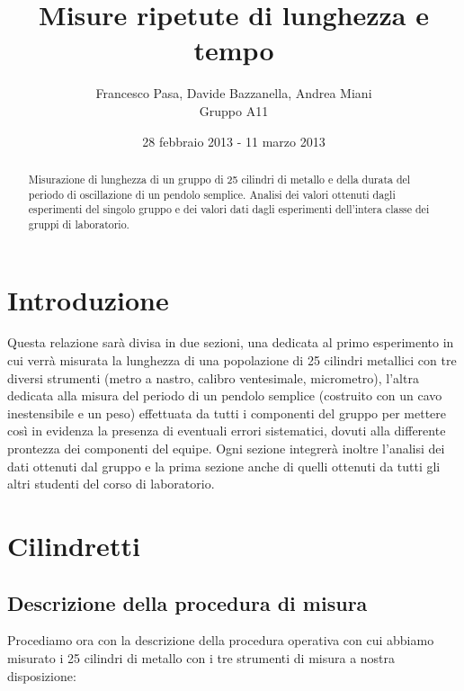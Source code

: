 \documentclass[12pt, twoside, a4paper]{article}
\begin{document}
\title{Misure ripetute di lunghezza e tempo}
\author{Francesco Pasa, Davide Bazzanella, Andrea Miani\\
Gruppo A11}
\date{28 febbraio 2013 - 11 marzo 2013}
\maketitle

\begin{abstract}
Misurazione di lunghezza di un gruppo di 25 cilindri di metallo e della durata del periodo di oscillazione di un pendolo semplice.
Analisi dei valori ottenuti dagli esperimenti del singolo gruppo e dei valori dati dagli esperimenti dell'intera classe dei gruppi di laboratorio.
\end{abstract}

\section{Introduzione}
Questa relazione sarà divisa in due sezioni, una dedicata al primo esperimento in cui verrà misurata la lunghezza di una popolazione di 25 cilindri metallici con tre diversi strumenti (metro a nastro, calibro ventesimale, micrometro), l'altra dedicata alla misura del periodo di un pendolo semplice (costruito con un cavo inestensibile e un peso) effettuata da tutti i componenti del gruppo per mettere così in evidenza la presenza di eventuali errori sistematici, dovuti alla differente prontezza dei componenti del equipe. Ogni sezione integrerà inoltre l'analisi dei dati ottenuti dal gruppo e la prima sezione anche di quelli ottenuti da tutti gli altri studenti del corso di laboratorio.

\section{Cilindretti}

\subsection{Descrizione della procedura di misura}
Procediamo ora con la descrizione della procedura operativa con cui abbiamo misurato i 25 cilindri di metallo con i tre strumenti di misura a nostra disposizione:
\end{document}
